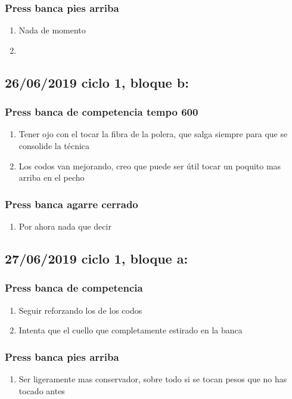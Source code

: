 \documentclass[11pt]{article}
\begin{document}
\subsubsection{Press banca pies arriba}
\label{sec:org3411a1d}
\begin{enumerate}
\item Nada de momento
\item 
\end{enumerate}
\subsection{26/06/2019 ciclo 1, bloque b:}
\label{sec:org74004d0}
\subsubsection{Press banca de competencia tempo 600}
\label{sec:org5cd6be3}
\begin{enumerate}
\item Tener ojo con el tocar la fibra de la polera, que salga siempre
para que se consolide la técnica
\item Los codos van mejorando, creo que puede ser útil tocar un poquito
mas arriba en el pecho
\end{enumerate}
\subsubsection{Press banca agarre cerrado}
\label{sec:org1a0e58e}
\begin{enumerate}
\item Por ahora nada que decir
\end{enumerate}
\subsection{27/06/2019 ciclo 1, bloque a:}
\label{sec:org70c0bea}
\subsubsection{Press banca de competencia}
\label{sec:orgb15c806}
\begin{enumerate}
\item Seguir reforzando los de los codos
\item Intenta que el cuello que completamente estirado en la banca
\end{enumerate}
\subsubsection{Press banca pies arriba}
\label{sec:org7993850}
\begin{enumerate}
\item Ser ligeramente mas conservador, sobre todo si se tocan pesos que
no has tocado antes
\end{enumerate}
\end{document}
